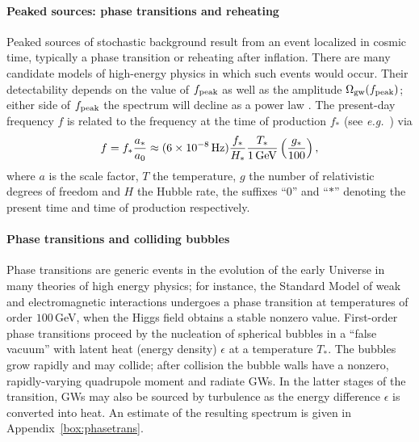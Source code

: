 \paragraph{Peaked sources: phase transitions and reheating}

\noindent Peaked sources of stochastic background result from an event localized in cosmic time, typically a phase transition or reheating after inflation. There are many candidate models of high-energy physics in which such events would occur. Their detectability depends on the value of $f_{\rm peak}$
as well as the amplitude $\Omega_{\rm gw}(f_{\rm peak})$; either side of $f_{\rm peak}$ the spectrum will decline as a power law \cite{Caprini:2009fx}. The present-day frequency $f$ is related to the frequency at the time of production $f_\ast$ (see {\em e.g.}\ \cite{Grojean:2006bp}) via
\begin{equation}
	f = f_\ast\frac{a_\ast}{a_0} \approx (6\times 10^{-8}\,{\rm Hz}) \frac{f_\ast}{H_\ast} \frac{T_\ast}{1\,{\rm GeV}}
	\left(\frac{g_\ast}{100}\right),
\end{equation}
where $a$ is the scale factor, $T$ the temperature, $g$ the number of relativistic degrees of freedom and $H$ the Hubble rate, the suffixes ``$0$'' and ``$\ast$'' denoting the present time and time of production respectively.

\paragraph{Phase transitions and colliding bubbles}

Phase transitions are generic events in the evolution of the early Universe in many theories of high energy physics; for 
instance, the Standard Model of weak and electromagnetic interactions undergoes a phase transition at temperatures of
order $100$\,GeV, when the Higgs field obtains a stable nonzero value. 
First-order phase transitions proceed by the nucleation of spherical bubbles in a ``false vacuum''
with latent heat (energy density) $\epsilon$ at a temperature $T_\ast$. The bubbles grow rapidly and may collide; after 
collision the bubble walls have a nonzero, rapidly-varying quadrupole moment and radiate GWs. In the 
latter stages of the transition, GWs may also be sourced by turbulence \cite{Kosowsky:2001xp} as the 
energy difference $\epsilon$ is converted into heat. An estimate of the resulting spectrum is given in Appendix~\ref{box:phasetrans}.

